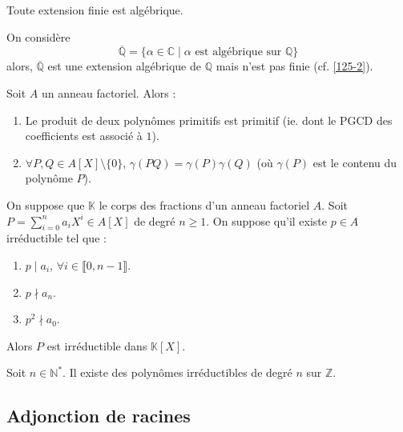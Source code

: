	\begin{proposition}
		Toute extension finie est algébrique.
	\end{proposition}

	\begin{cexample}
		\label{125-1}
		On considère
		\[ \overline{\mathbb{Q}} = \{ \alpha \in \mathbb{C} \mid \alpha \text{ est algébrique sur } \mathbb{Q} \} \]
		alors, $\overline{\mathbb{Q}}$ est une extension algébrique de $\mathbb{Q}$ mais n'est pas finie (cf. \cref{125-2}).
	\end{cexample}


	\begin{lemma}[Gauss]
		Soit $A$ un anneau factoriel. Alors :
		\begin{enumerate}[label=(\roman*)]
			\item Le produit de deux polynômes primitifs est primitif (ie. dont le PGCD des coefficients est associé à $1$).
			\item $\forall P, Q \in A[X] \setminus \{ 0 \}$, $\gamma(PQ) = \gamma(P) \gamma(Q)$ (où $\gamma(P)$ est le contenu du polynôme $P$).
		\end{enumerate}
	\end{lemma}


	\begin{theorem}
		On suppose que $\mathbb{K}$ le corps des fractions d'un anneau factoriel $A$. Soit $P = \sum_{i=0}^n a_i X^i \in A[X]$ de degré $n \geq 1$. On suppose qu'il existe $p \in A$ irréductible tel que :
		\begin{enumerate}[label=(\roman*)]
			\item $p \mid a_i$, $\forall i \in \llbracket 0, n-1 \rrbracket$.
			\item $p \nmid a_n$.
			\item $p^2 \nmid a_0$.
		\end{enumerate}
		Alors $P$ est irréductible dans $\mathbb{K}[X]$.
	\end{theorem}


	\begin{application}
		\label{125-2}
		Soit $n \in \mathbb{N}^*$. Il existe des polynômes irréductibles de degré $n$ sur $\mathbb{Z}$.
	\end{application}
	
	\newpage

	\subsection{Adjonction de racines}

